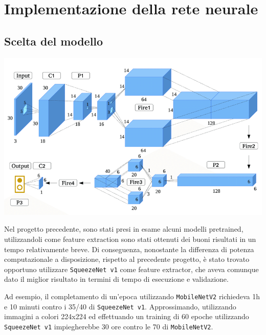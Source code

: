 \documentclass[11pt]{article}
\begin{document}
\section{Implementazione della rete neurale}

\subsection{Scelta del modello}

\begin{center}
    \begin{minipage}{0.48\linewidth}
    \includegraphics[width=\linewidth]{SqueezeNet-like-architecture.png}
    \end{minipage}
\end{center}

Nel progetto precedente, sono stati presi in esame alcuni modelli pretrained, utilizzandoli come feature extraction sono stati ottenuti dei buoni risultati in un tempo relativamente breve.
Di conseguenza, nonostante la differenza di potenza computazionale a disposizione, rispetto al precedente progetto, è stato trovato opportuno utilizzare \texttt{SqueezeNet v1} come feature extractor, che aveva comunque dato il miglior risultato in termini di tempo di esecuzione e validazione.

Ad esempio, il completamento di un'epoca utilizzando \texttt{MobileNetV2} richiedeva 1h e 10 minuti contro i 35/40 di \texttt{SqueezeNet v1}. Approssimando, utilizzando immagini a colori 224x224 ed effettuando un training di 60 epoche utilizzando \texttt{SqueezeNet v1} impiegherebbe 30 ore contro le 70 di \texttt{MobileNetV2}.

\end{document}
